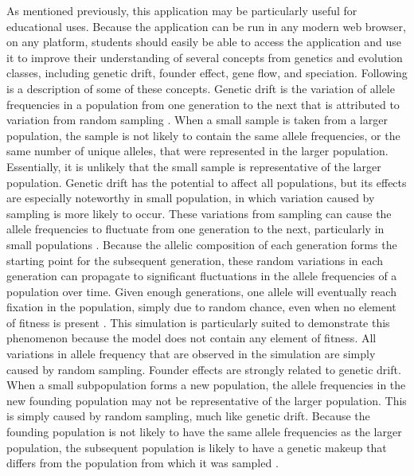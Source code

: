 \documentclass[12pt]{article}
\begin{document}
\begin{spacing}{1.6}
As mentioned previously, this application may be particularly useful for educational uses. Because the application can be run in any modern web browser, on any platform, students should easily be able to access the application and use it to improve their understanding of several concepts from genetics and evolution classes, including genetic drift, founder effect, gene flow, and speciation. Following is a description of some of these concepts.\newline
\newline
Genetic drift is the variation of allele frequencies in a population from one generation to the next that is attributed to variation from random sampling \cite{evolution}. When a small sample is taken from a larger population, the sample is not likely to contain the same allele frequencies, or the same number of unique alleles, that were represented in the larger population. Essentially, it is unlikely that the small sample is representative of the larger population. Genetic drift has the potential to affect all populations, but its effects are especially noteworthy in small population, in which variation caused by sampling is more likely to occur. These variations from sampling can cause the allele frequencies to fluctuate from one generation to the next, particularly in small populations \cite{evolution}. Because the allelic composition of each generation forms the starting point for the subsequent generation, these random variations in each generation can propagate to significant fluctuations in the allele frequencies of a population over time. Given enough generations, one allele will eventually reach fixation in the population, simply due to random chance, even when no element of fitness is present \cite{evolution}. This simulation is particularly suited to demonstrate this phenomenon because the model does not contain any element of fitness. All variations in allele frequency that are observed in the simulation are simply caused by random sampling.\newline
\newline
Founder effects are strongly related to genetic drift. When a small subpopulation forms a new population, the allele frequencies in the new founding population may not be representative of the larger population. This is simply caused by random sampling, much like genetic drift. Because the founding population is not likely to have the same allele frequencies as the larger population, the subsequent population is likely to have a genetic makeup that differs from the population from which it was sampled \cite{genAnalysis}.\newline

\end{spacing}
\end{document}
